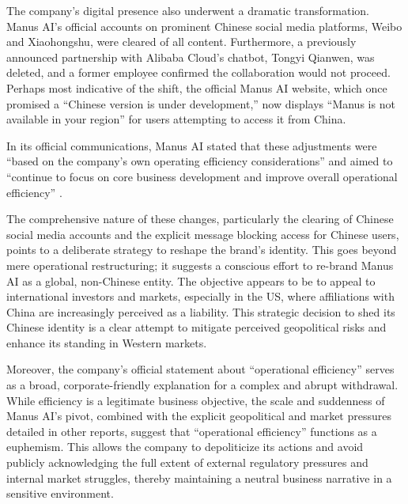 The company's digital presence also underwent a dramatic transformation.
Manus AI's official accounts on prominent Chinese social media platforms, Weibo and Xiaohongshu, were cleared of all content.
Furthermore, a previously announced partnership with Alibaba Cloud's chatbot, Tongyi Qianwen, was deleted, and a former employee confirmed the collaboration would not proceed.
Perhaps most indicative of the shift, the official Manus AI website, which once promised a ``Chinese version is under development,'' now displays ``Manus is not available in your region'' for users attempting to access it from China.

In its official communications, Manus AI stated that these adjustments were ``based on the company's own operating efficiency considerations'' and aimed to ``continue to focus on core business development and improve overall operational efficiency'' \cite{standard_manus_restructures}.

The comprehensive nature of these changes, particularly the clearing of Chinese social media accounts and the explicit message blocking access for Chinese users, points to a deliberate strategy to reshape the brand's identity.
This goes beyond mere operational restructuring; it suggests a conscious effort to re-brand Manus AI as a global, non-Chinese entity.
The objective appears to be to appeal to international investors and markets, especially in the US, where affiliations with China are increasingly perceived as a liability.
This strategic decision to shed its Chinese identity is a clear attempt to mitigate perceived geopolitical risks and enhance its standing in Western markets.

Moreover, the company's official statement about ``operational efficiency'' serves as a broad, corporate-friendly explanation for a complex and abrupt withdrawal.
While efficiency is a legitimate business objective, the scale and suddenness of Manus AI's pivot, combined with the explicit geopolitical and market pressures detailed in other reports, suggest that ``operational efficiency'' functions as a euphemism.
This allows the company to depoliticize its actions and avoid publicly acknowledging the full extent of external regulatory pressures and internal market struggles, thereby maintaining a neutral business narrative in a sensitive environment.

